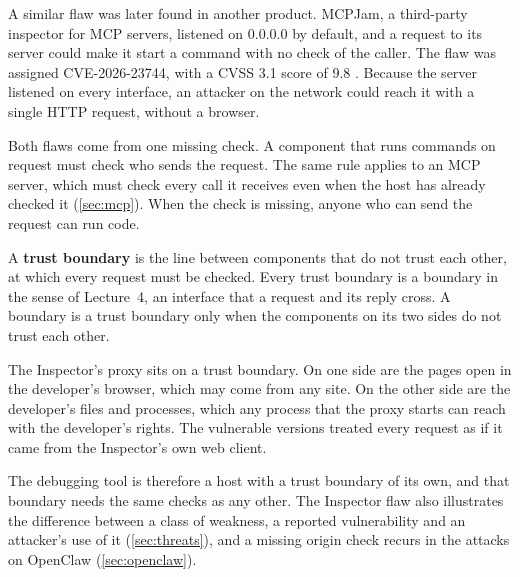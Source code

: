 A similar flaw was later found in another product. MCPJam, a third-party inspector for MCP servers,
listened on 0.0.0.0 by default, and a request to its server could make it start a command with no
check of the caller. The flaw was assigned CVE-2026-23744, with a CVSS 3.1 score of 9.8
\citep{nvd-cve-2026-23744}. Because the server listened on every interface, an attacker on the
network could reach it with a single HTTP request, without a browser.

Both flaws come from one missing check. A component that runs commands on request must check who
sends the request. The same rule applies to an MCP server, which must check every call it receives
even when the host has already checked it (\cref{sec:mcp}). When the check is missing, anyone who
can send the request can run code.

A \textbf{trust boundary} is the line between components that do not trust each other, at which
every request must be checked. Every trust boundary is a boundary in the sense of Lecture~4, an
interface that a request and its reply cross. A boundary is a trust boundary only when the
components on its two sides do not trust each other.

The Inspector's proxy sits on a trust boundary. On one side are the pages open in the developer's
browser, which may come from any site. On the other side are the developer's files and processes,
which any process that the proxy starts can reach with the developer's rights. The vulnerable versions
treated every request as if it came from the Inspector's own web client.

The debugging tool is therefore a host with a trust boundary of its own, and that boundary needs
the same checks as any other. The Inspector flaw also illustrates the difference between a class of
weakness, a reported vulnerability and an attacker's use of it (\cref{sec:threats}), and a missing
origin check recurs in the attacks on OpenClaw (\cref{sec:openclaw}).

